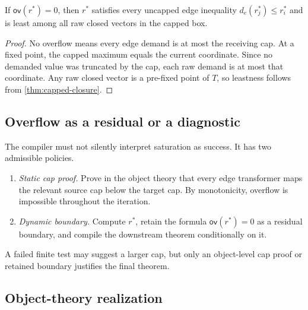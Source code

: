 \begin{corollary}\label{cor:raw-demand-adequacy}
If \(\mathsf{ov}(r^*)=0\), then \(r^*\) satisfies every uncapped edge inequality \(d_e(r^*_j)\le r^*_i\) and is least among all raw closed vectors in the capped box.
\end{corollary}

\begin{proof}
No overflow means every edge demand is at most the receiving cap.  At a fixed point, the capped maximum equals the current coordinate.  Since no demanded value was truncated by the cap, each raw demand is at most that coordinate.  Any raw closed vector is a pre-fixed point of \(T\), so leastness follows from \cref{thm:capped-closure}.
\end{proof}

\subsection{Overflow as a residual or a diagnostic}

The compiler must not silently interpret saturation as success.  It has two admissible policies.
\begin{enumerate}[label=(\arabic*)]
  \item \emph{Static cap proof.}  Prove in the object theory that every edge transformer maps the relevant source cap below the target cap.  By monotonicity, overflow is impossible throughout the iteration.
  \item \emph{Dynamic boundary.}  Compute \(r^*\), retain the formula \(\mathsf{ov}(r^*)=0\) as a residual boundary, and compile the downstream theorem conditionally on it.
\end{enumerate}
A failed finite test may suggest a larger cap, but only an object-level cap proof or retained boundary justifies the final theorem.

\subsection{Object-theory realization}

